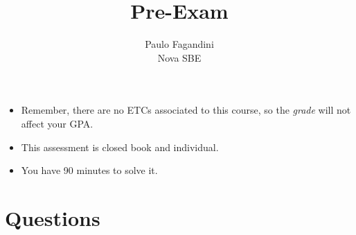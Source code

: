 \documentclass[a4paper,12pt,answers]{exam}
\title{Pre-Exam}
\author{Paulo Fagandini\\ Nova SBE}
\date{}
\begin{document}
\maketitle
\thispagestyle{headandfoot}

\vspace{0.1cm}

\begin{itemize}
	\item Remember, there are no ETCs associated to this course, so the \textit{grade} will not affect your GPA.
	\item This assessment is closed book and individual.
	\item You have 90 minutes to solve it.
\end{itemize}

\section*{Questions}
\end{document}
